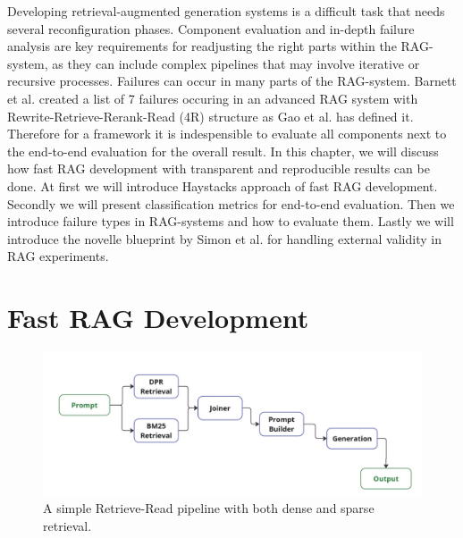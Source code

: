 

Developing retrieval-augmented generation systems is a difficult task that needs several reconfiguration phases.\cite{Simon.10112024} Component evaluation and in-depth failure analysis are key requirements for readjusting the right parts within the RAG-system, as they can include complex pipelines that may involve iterative or recursive processes. Failures can occur in many parts of the RAG-system. Barnett et al.\cite{Barnett.2024} created a list of 7 failures occuring in an advanced RAG system with Rewrite-Retrieve-Rerank-Read (4R) structure as Gao et al.\cite{Gao.18.12.2023} has defined it. Therefore for a framework it is indespensible to evaluate all components next to the end-to-end evaluation for the overall result. In this chapter, we will discuss how fast RAG development with transparent and reproducible results can be done. At first we will introduce Haystacks approach of fast RAG development. Secondly we will present classification metrics for end-to-end evaluation. Then we introduce failure types in RAG-systems and how to evaluate them. Lastly we will introduce the novelle blueprint by Simon et al.\cite{Simon.10112024} for handling external validity in RAG experiments. 

\section{Fast RAG Development}

\begin{figure}[b]
    \centering
    \includegraphics[width=\textwidth]{images/showcase-pipeline.pdf}
    \caption{A simple Retrieve-Read pipeline with both dense and sparse retrieval.}
    \label{fig:showcase}
\end{figure}


